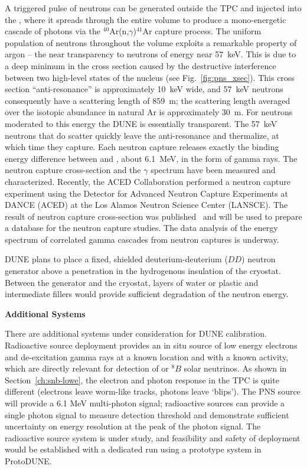 A triggered pulse of neutrons can be generated outside the TPC and injected into the , where it spreads through the entire volume to produce a mono-energetic cascade of photons via the $^{40}$Ar(n,$\gamma$)$^{41}$Ar capture process. The uniform population of neutrons throughout the  volume exploits a remarkable property of argon -- the near transparency to neutrons of energy near \SI{57}{\keV}. 
This is due to a deep minimum in the cross section caused by the destructive interference between two high-level states of the  nucleus (see Fig.~\ref{fig:pns_xsec}). This cross section ``anti-resonance'' is approximately  \SI{10}{\keV} wide, and \SI{57}{keV} neutrons consequently have a scattering length of \SI{859}{m}; the scattering length averaged over the isotopic abundance in natural Ar is approximately \SI{30}{m}. 
For neutrons moderated to this energy the DUNE  is essentially transparent. The \SI{57}{keV} neutrons that do scatter quickly leave the anti-resonance and thermalize, at which time they capture. Each neutron capture releases exactly the binding energy difference between  and , about \SI{6.1}{\MeV}, in the form of gamma rays. 
The neutron capture cross-section and the $\gamma$ spectrum have been measured and characterized. Recently, the ACED Collaboration performed a neutron capture experiment using  the Detector  for Advanced  Neutron  Capture  Experiments  at DANCE (ACED)  at the  Los  Alamos  Neutron  Science  Center  (LANSCE). The result of neutron capture cross-section was published~\cite{Fischer:2019qfr} and will be used to prepare a database for the neutron capture studies. The data analysis of the energy spectrum of correlated gamma cascades from neutron captures is underway.

DUNE plans
to place a fixed, shielded deuterium-deuterium ($DD$) neutron generator  above a penetration in the hydrogenous insulation of the  cryostat. Between the generator and the cryostat, layers of water or plastic and intermediate fillers would provide sufficient degradation of the neutron energy. 

\textbf{Additional Systems}

There are 
additional systems under consideration for DUNE calibration. Radioactive source deployment provides an in situ source of low energy electrons and de-excitation gamma rays at a known location and with a known activity, which are directly relevant for detection of  or $^{8}B$ solar neutrinos. As shown in Section~\ref{ch:snb-lowe}, the electron and photon response in the TPC is quite different (electrons leave worm-like tracks, photons leave `blips'). The PNS source will provide a 6.1 MeV multi-photon signal; radioactive sources can provide a single photon signal to measure detection threshold and demonstrate sufficient uncertainty on energy resolution at the peak of the  photon signal.  The radioactive source system is under study, and feasibility and safety of deployment would be established with a dedicated run using a prototype system in ProtoDUNE.

